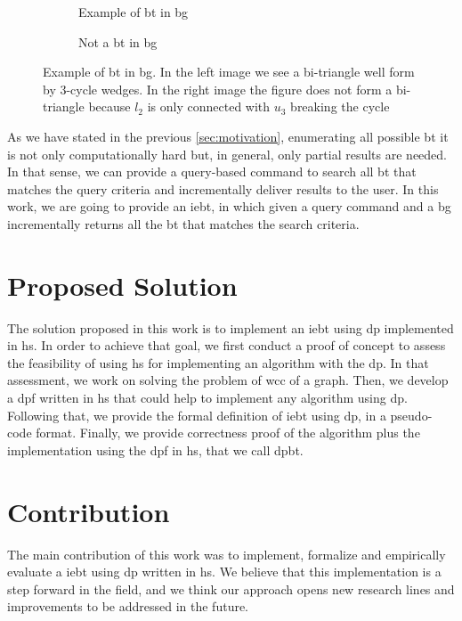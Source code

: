\begin{figure}[htp!]
\begin{subfigure}[b]{0.5\textwidth}
\centering
{}
\caption{Example of \acrshort{bt} in \acrshort{bg}}
\label{fig:bitriangle-example}
\end{subfigure}
\begin{subfigure}[b]{0.5\textwidth}
\centering
{}
\caption{Not a \acrshort{bt} in \acrshort{bg}}
\label{fig:bitriangle-not}
\end{subfigure}
\caption[{[Int] Example of \acrshort{bt} in \acrshort{bg}}]{Example of \acrshort{bt} in \acrshort{bg}. In the left image we see a bi-triangle well form by 3-cycle wedges. In the right image the figure does not form a bi-triangle because $l_2$ is only connected with $u_3$ breaking the cycle}
\end{figure}

As we have stated in the previous \autoref{sec:motivation}, enumerating all possible \acrshort{bt} it is not only computationally hard but, in general, only partial results are needed.
In that sense, we can provide a query-based command to search all \acrshort{bt} that matches the query criteria and incrementally deliver results to the user.
In this work, we are going to provide an \acrfull{iebt}, in which given a query command and a \acrlong{bg} incrementally returns all the \acrlong{bt} that matches the search criteria.

\section{Proposed Solution}
The solution proposed in this work is to implement an \acrfull{iebt} using \acrfull{dp} implemented in \acrfull{hs}.
In order to achieve that goal, we first conduct a proof of concept to assess the feasibility of using \acrshort{hs} for implementing an algorithm with the \acrshort{dp}.
In that assessment, we work on solving the problem of \acrfull{wcc} of a graph. Then, we develop a \acrlong{dpf} written in \acrlong{hs} that could help to implement any algorithm using \acrshort{dp}.
Following that, we provide the formal definition of \acrshort{iebt} using \acrshort{dp}, in a pseudo-code format. 
Finally, we provide correctness proof of the algorithm plus the implementation using the \acrshort{dpf} in \acrshort{hs}, that we call \acrfull{dpbt}.

\section{Contribution}\label{sec:contrib}
The main contribution of this work was to implement, formalize and empirically evaluate a \acrlong{iebt} using \acrlong{dp} written in \acrshort{hs}.
We believe that this implementation is a step forward in the field, and we think our approach opens new research lines and improvements to be addressed in the future. 

